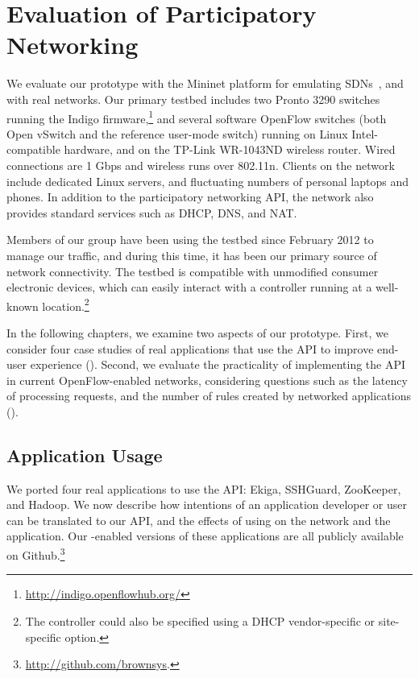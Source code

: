 \chapter{Evaluation of Participatory Networking}
\label{sec:Evaluation}


We evaluate our \sys prototype with the Mininet platform for
emulating SDNs~\cite{Mininet}, and with real networks. Our primary
testbed includes two Pronto 3290 switches running the Indigo
firmware,\footnote{\scriptsize{\url{http://indigo.openflowhub.org/}}}
and several software OpenFlow switches (both Open vSwitch and the
reference user-mode switch) running
on Linux Intel-compatible
hardware, and on the TP-Link WR-1043ND wireless router.  Wired
connections are 1 Gbps and wireless runs over 802.11n. Clients on
the network include dedicated Linux servers, and fluctuating numbers
of personal laptops and phones. In addition to the participatory
networking API, the network also provides standard services such as
DHCP, DNS, and NAT.

Members of our group have been using the testbed since February 2012
to manage our traffic, and during this time, it has
been our primary source of network connectivity. The testbed is
compatible with unmodified consumer electronic devices, which can
easily interact with a \sys controller running at a well-known
location.\footnote{The \sys controller could also be specified using
a DHCP vendor-specific or site-specific option.}

In the following chapters, we examine two aspects of our prototype.
First, we consider four case studies of real applications
that use the \sys API to improve end-user experience
().  Second, we evaluate the practicality
of implementing the \sys API in current OpenFlow-enabled networks,
considering questions such as the latency of processing requests,
and the number of rules created by networked applications
().

\section{Application Usage}
\label{sec:ApplicationUsage}

We ported four real applications to use the \sys API: Ekiga,
SSHGuard, ZooKeeper, and Hadoop. We now describe how intentions of
an application developer or user can be translated to our API, and
the effects of using \sys on the network and the application. Our
\sys-enabled versions of these applications are all publicly
available on Github.\footnote{\url{http://github.com/brownsys}.}

